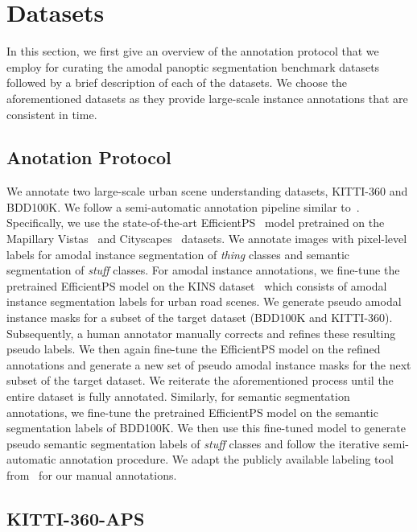 \documentclass[10pt,twocolumn,letterpaper]{article}
\begin{document}
\section{Datasets}
In this section, we first give an overview of the annotation protocol that we employ for curating the amodal panoptic segmentation benchmark datasets followed by a brief description of each of the datasets. We choose the aforementioned datasets as they provide large-scale instance annotations that are consistent in time.





\subsection{Anotation Protocol}

We annotate two large-scale urban scene understanding datasets, KITTI-360 and BDD100K. We follow a semi-automatic annotation pipeline similar to~\cite{voigtlaender2019mots}. Specifically, we use the state-of-the-art EfficientPS~\cite{mohan2020efficientps} model pretrained on the Mapillary Vistas~\cite{neuhold2017mapillary} and Cityscapes~\cite{cordts2016cityscapes} datasets. We annotate images with pixel-level labels for amodal instance segmentation of \textit{thing} classes and semantic segmentation of \textit{stuff} classes. For amodal instance annotations, we fine-tune the pretrained EfficientPS model on the KINS dataset~\cite{qi2019amodal} which consists of amodal instance segmentation labels for urban road scenes. We generate pseudo amodal instance masks for a subset of the target dataset (BDD100K and KITTI-360). Subsequently, a human annotator manually corrects and refines these resulting pseudo labels. We then again fine-tune the EfficientPS model on the refined annotations and generate a new set of pseudo amodal instance masks for the next subset of the target dataset. We reiterate the aforementioned process until the entire dataset is fully annotated. Similarly, for semantic segmentation annotations, we fine-tune the pretrained EfficientPS model on the semantic segmentation labels of BDD100K. We then use this fine-tuned model to generate pseudo semantic segmentation labels of \textit{stuff} classes and follow the iterative semi-automatic annotation procedure. We adapt the publicly available labeling tool from~\cite{cordts2016cityscapes} for our manual annotations.

\subsection{KITTI-360-APS}
\end{document}
